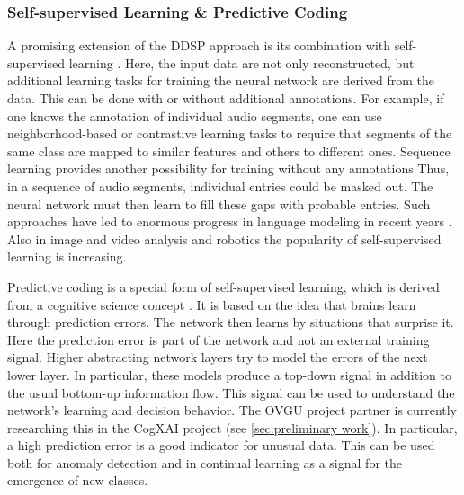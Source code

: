 \documentclass[11pt]{article}
\begin{document}
\subsubsection{Self-supervised Learning \& Predictive Coding}

A promising extension of the DDSP approach is its combination with self-supervised learning \cite{tsai2020demystifying}.
Here, the input data are not only reconstructed, but additional learning tasks for training the neural network are derived from the data. 
This can be done with or without additional annotations.
For example, if one knows the annotation of individual audio segments, one can use neighborhood-based or contrastive learning tasks \cite{saunshi19contrastive} to require that segments of the same class are mapped to similar features and others to different ones.
Sequence learning provides another possibility for training without any annotations
Thus, in a sequence of audio segments, individual entries could be masked out.
The neural network must then learn to fill these gaps with probable entries.
Such approaches have led to enormous progress in language modeling in recent years \cite{devlin2018bert,lan2019albert}.
Also in image and video analysis \cite{tung2017self,zhai2019s4l,dwibedi2019temporal,jing2020self} and robotics \cite{sermanet2018timecontrastive,lee2019making} the popularity of self-supervised learning is increasing.

Predictive coding is a special form of self-supervised learning, 
which is derived from a cognitive science concept \cite{huang2011predictive}.
It is based on the idea that brains learn through prediction errors.
The network then learns by situations that surprise it.
Here the prediction error is part of the network and not an external training signal.
Higher abstracting network layers try to model the errors of the next lower layer.
In particular, these models produce a top-down signal in addition to the usual bottom-up information flow.
This signal can be used to understand the network's learning and decision behavior.
The OVGU project partner is currently researching this in the CogXAI project (see \autoref{sec:preliminary work}).
In particular, a high prediction error is a good indicator for unusual data.
This can be used both for anomaly detection and in continual learning as a signal for the emergence of new classes.
\end{document}
